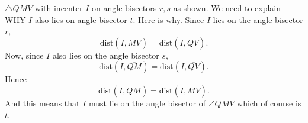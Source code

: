 \documentclass{tufte-handout}
\newcommand{\uv}{\vspace{.1in}}
\begin{document}
\begin{tcolorbox}[enhanced jigsaw,breakable,pad at break*=1mm,
  colback=cyan!2!white,colframe=blue!75!black,title=Student View: Slide 15,drop fuzzy shadow,watermark color=white,watermark text=\arabic{tcbbreakpart}]
  
 \uv \begin{center}
 \end{center}
 
 \uv {} $\triangle QMV$ with incenter $I$ on angle bisectors $r, s$ as shown. We need to explain WHY $I$ also lies on angle bisector $t.$ Here is why. Since $I$ lies on the angle bisector $r,$ \[ \text{dist}(I, \overline{MV})=\text{dist}(I,\overline{QV}).\] Now, since $I$ also lies on the angle bisector $s,$ \[ \text{dist}(I, \overline{QM})=\text{dist}(I,\overline{QV}).\] Hence \[ \text{dist}(I, \overline{QM})=\text{dist}(I,\overline{MV}).\] And this means that $I$ must lie on the angle bisector of $\angle QMV$ which of course is $t.$ 
 
\end{tcolorbox}

\pagebreak
\end{document}
